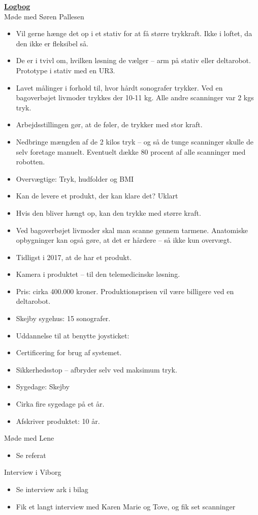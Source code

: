 \underline{\textbf{Logbog}}\\
Møde med Søren Pallesen
\begin{itemize}
\item Vil gerne hænge det op i et stativ for at få større trykkraft. Ikke i loftet, da den ikke er fleksibel så. 
\item De er i tvivl om, hvilken løsning de vælger – arm på stativ eller deltarobot. 
Prototype i stativ med en UR3. 
\end{itemize}
\begin{itemize}
\item Lavet målinger i forhold til, hvor hårdt sonografer trykker. Ved en bagoverbøjet livmoder trykkes der 10-11 kg. Alle andre scanninger var 2 kgs tryk. 
\item Arbejdsstillingen gør, at de føler, de trykker med stor kraft. 
\end{itemize}
\begin{itemize}
\item Nedbringe mængden af de 2 kilos tryk – og så de tunge scanninger skulle de selv foretage manuelt. Eventuelt dække 80 procent af alle scanninger med robotten. 
\item Overvægtige: Tryk, hudfolder og BMI
\item Kan de levere et produkt, der kan klare det? Uklart 
\item Hvis den bliver hængt op, kan den trykke med større kraft. 
\end{itemize}
\begin{itemize}
\item Ved bagoverbøjet livmoder skal man scanne gennem tarmene. Anatomiske opbygninger kan også gøre, at det er hårdere – så ikke kun overvægt.
\end{itemize}
\begin{itemize}
\item Tidligst i 2017, at de har et produkt. 
\item Kamera i produktet – til den telemedicinske løsning. 
\item Pris: cirka 400.000 kroner. Produktionsprisen vil være billigere ved en deltarobot. 
\item Skejby sygehus: 15 sonografer. 
\item Uddannelse til at benytte joysticket: 
\item Certificering for brug af systemet. 
\item Sikkerhedsstop – afbryder selv ved maksimum tryk. 
\item Sygedage: Skejby
\item Cirka fire sygedage på et år. 
\item Afskriver produktet: 10 år. 
\end{itemize}
Møde med Lene
\begin{itemize}
\item Se referat
\end{itemize}
Interview i Viborg
\begin{itemize}
\item Se interview ark i bilag
\item Fik et langt interview med Karen Marie og Tove, og fik set scanninger
\end{itemize}
\newpage